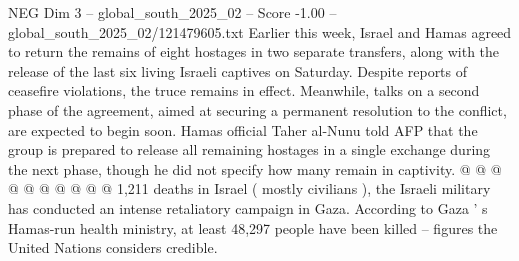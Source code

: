 \begin{textsample}{NEG Dim 3 – global\_south\_2025\_02 – Score -1.00 – global\_south\_2025\_02/121479605.txt}
Earlier this week, Israel and Hamas agreed to return the remains of eight hostages in two separate transfers, along with the release of the last six living Israeli captives on Saturday.
Despite reports of ceasefire violations, the truce remains in effect.
Meanwhile, talks on a second phase of the agreement, aimed at securing a permanent resolution to the conflict, are expected to begin soon.
Hamas official Taher al-Nunu told AFP that the group is prepared to release all remaining hostages in a single exchange during the next phase, though he did not specify how many remain in captivity. @ @ @ @ @ @ @ @ @ @ 1,211 deaths in Israel ( mostly civilians ), the Israeli military has conducted an intense retaliatory campaign in Gaza.
According to Gaza ' s Hamas-run health ministry, at least 48,297 people have been killed -- figures the United Nations considers credible.

\end{textsample}
